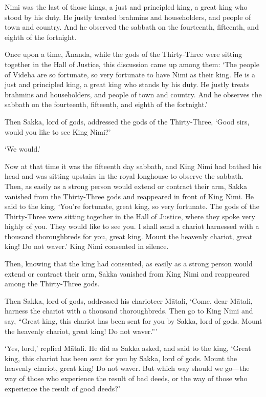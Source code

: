 \documentclass[12pt,openany]{book}%
\begin{document}
Nimi was the last of those kings, a just and principled king, a great king who stood by his duty. He justly treated brahmins and householders, and people of town and country. And he observed the sabbath on the fourteenth, fifteenth, and eighth of the fortnight. 

Once upon a time, Ānanda, while the gods of the Thirty-Three were sitting together in the Hall of Justice, this discussion came up among them: ‘The people of Videha are so fortunate, so very fortunate to have Nimi as their king. He is a just and principled king, a great king who stands by his duty. He justly treats brahmins and householders, and people of town and country. And he observes the sabbath on the fourteenth, fifteenth, and eighth of the fortnight.’ 

Then Sakka, lord of gods, addressed the gods of the Thirty-Three, ‘Good sirs, would you like to see King Nimi?’ 

‘We would.’ 

Now at that time it was the fifteenth day sabbath, and King Nimi had bathed his head and was sitting upstairs in the royal longhouse to observe the sabbath. Then, as easily as a strong person would extend or contract their arm, Sakka vanished from the Thirty-Three gods and reappeared in front of King Nimi. He said to the king, ‘You’re fortunate, great king, so very fortunate. The gods of the Thirty-Three were sitting together in the Hall of Justice, where they spoke very highly of you. They would like to see you. I shall send a chariot harnessed with a thousand thoroughbreds for you, great king. Mount the heavenly chariot, great king! Do not waver.’ King Nimi consented in silence. 

Then, knowing that the king had consented, as easily as a strong person would extend or contract their arm, Sakka vanished from King Nimi and reappeared among the Thirty-Three gods. 

Then Sakka, lord of gods, addressed his charioteer \textsanskrit{Mātali}, ‘Come, dear \textsanskrit{Mātali}, harness the chariot with a thousand thoroughbreds. Then go to King Nimi and say, “Great king, this chariot has been sent for you by Sakka, lord of gods. Mount the heavenly chariot, great king! Do not waver.”’ 

‘Yes, lord,’ replied \textsanskrit{Mātali}. He did as Sakka asked, and said to the king, ‘Great king, this chariot has been sent for you by Sakka, lord of gods. Mount the heavenly chariot, great king! Do not waver. But which way should we go—the way of those who experience the result of bad deeds, or the way of those who experience the result of good deeds?’ 
\end{document}
